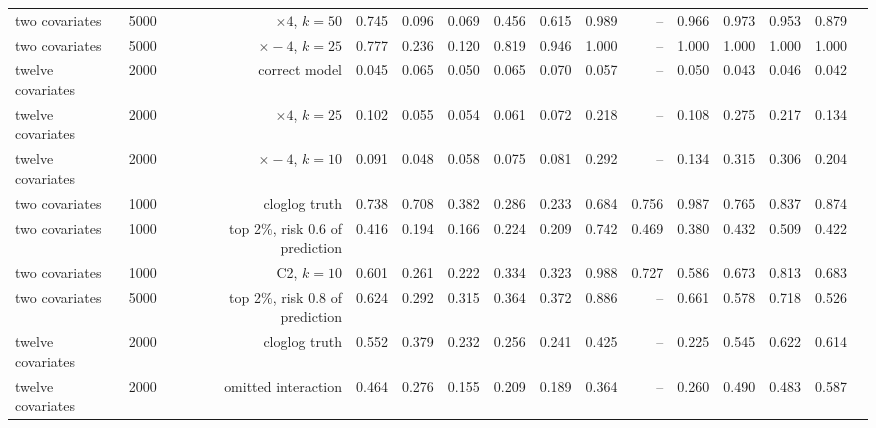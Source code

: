 \begin{table}[htbp]
{\begin{tabular}{llrrrrrrrrrrrrr}
two covariates & 5000 & $\times4$, $k=50$ & \cellcolor{black!12}0.745 & 0.096 & 0.069 & \cellcolor{black!12}0.456 & \cellcolor{black!12}0.615 & \cellcolor{black!12}0.989 & -- & \cellcolor{black!12}0.966 & \cellcolor{black!12}0.973 & \cellcolor{black!12}0.953 & \cellcolor{black!12}0.879 \\
two covariates & 5000 & $\times-4$, $k=25$ & \cellcolor{black!12}0.777 & \cellcolor{black!12}0.236 & \cellcolor{black!12}0.120 & \cellcolor{black!12}0.819 & \cellcolor{black!12}0.946 & \cellcolor{black!12}1.000 & -- & \cellcolor{black!12}1.000 & \cellcolor{black!12}1.000 & \cellcolor{black!12}1.000 & \cellcolor{black!12}1.000 \\
twelve covariates & 2000 & correct model & 0.045 & 0.065 & 0.050 & 0.065 & 0.070 & 0.057 & -- & 0.050 & 0.043 & 0.046 & 0.042 \\
twelve covariates & 2000 & $\times4$, $k=25$ & \cellcolor{black!12}0.102 & 0.055 & 0.054 & 0.061 & 0.072 & \cellcolor{black!12}0.218 & -- & \cellcolor{black!12}0.108 & \cellcolor{black!12}0.275 & \cellcolor{black!12}0.217 & \cellcolor{black!12}0.134 \\
twelve covariates & 2000 & $\times-4$, $k=10$ & 0.091 & 0.048 & 0.058 & 0.075 & 0.081 & \cellcolor{black!12}0.292 & -- & \cellcolor{black!12}0.134 & \cellcolor{black!12}0.315 & \cellcolor{black!12}0.306 & \cellcolor{black!12}0.204 \\
two covariates & 1000 & cloglog truth & 0.738 & 0.708 & 0.382 & 0.286 & 0.233 & 0.684 & 0.756 & 0.987 & 0.765 & 0.837 & 0.874 \\
two covariates & 1000 & top 2\%, risk 0.6 of prediction & 0.416 & 0.194 & 0.166 & 0.224 & 0.209 & 0.742 & 0.469 & 0.380 & 0.432 & 0.509 & 0.422 \\
two covariates & 1000 & C2, $k=10$ & 0.601 & 0.261 & 0.222 & 0.334 & 0.323 & 0.988 & 0.727 & 0.586 & 0.673 & 0.813 & 0.683 \\
two covariates & 5000 & top 2\%, risk 0.8 of prediction & 0.624 & 0.292 & 0.315 & 0.364 & 0.372 & 0.886 & -- & 0.661 & 0.578 & 0.718 & 0.526 \\
twelve covariates & 2000 & cloglog truth & 0.552 & 0.379 & 0.232 & 0.256 & 0.241 & 0.425 & -- & 0.225 & 0.545 & 0.622 & 0.614 \\
twelve covariates & 2000 & omitted interaction & 0.464 & 0.276 & 0.155 & 0.209 & 0.189 & 0.364 & -- & 0.260 & 0.490 & 0.483 & 0.587 \\
\hline\end{tabular}}\end{table}
